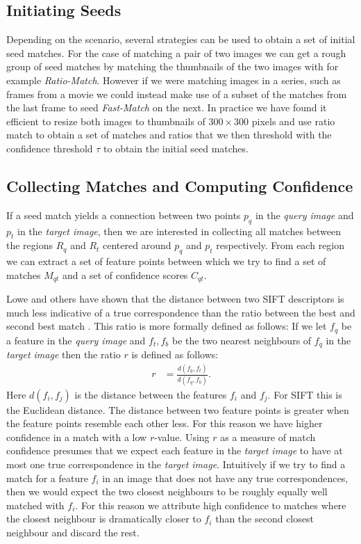 \documentclass[runningheads]{llncs}
\begin{document}
\subsection{Initiating Seeds}
\label{seeds}
%
Depending on the scenario, several strategies can be used to obtain a set of initial seed matches. For the case of matching a pair of two images we can get a rough group of seed matches by matching the thumbnails of the two images with for example \emph{Ratio-Match}. However if we were matching images in a series, such as frames from a movie we could instead make use of a subset of the matches from the last frame to seed \emph{Fast-Match} on the next. In practice we have found it efficient to resize both images to thumbnails of $300\times 300$ pixels and use ratio match to obtain a set of matches and ratios that we then threshold with the confidence threshold $\tau$ to obtain the initial seed matches.

\subsection{Collecting Matches and Computing Confidence}
\label{collection}
%
If a seed match yields a connection between two points $p_q$ in the \emph{query image} and $p_t$ in the \emph{target image}, then we are interested in collecting all matches between the regions $R_q$ and $R_t$ centered around $p_q$ and $p_t$ respectively. From each region we can extract a set of feature points between which we try to find a set of matches $M_{qt} $ and a set of confidence scores $C_{qt}$.

Lowe and others have shown that the distance between two SIFT descriptors is much less indicative of a true correspondence than the ratio between the best and second best match \cite{lowe2004sift,mikolajczyk2005performance,moreels2007evaluation,rabin2009statistical}. This ratio is more formally defined as follows: If we let $f_q$ be a feature in the \emph{query image} and $f_t, f_b$ be the two nearest neighbours of $f_q$ in the \emph{target image} then the ratio $r$ is defined as follows:
\begin{align*}
    r &= \frac{d(f_{q}, f_{t})}{d(f_{q}, f_{b})}.
\end{align*}
Here $d(f_i,f_j)$ is the distance between the features $f_i$ and $f_j$. For SIFT this is the Euclidean distance. The distance between two feature points is greater when the feature points resemble each other less. For this reason we have higher confidence in a match with a low $r$-value. Using $r$ as a measure of match confidence presumes that we expect each feature in the \emph{target image} to have at most one true correspondence in the \emph{target image}. Intuitively if we try to find a match for a feature $f_i$ in an image that does not have any true correspondences, then we would expect the two closest neighbours to be roughly equally well matched with $f_i$. For this reason we attribute high confidence to matches where the closest neighbour is dramatically closer to $f_i$ than the second closest neighbour and discard the rest.
\end{document}
